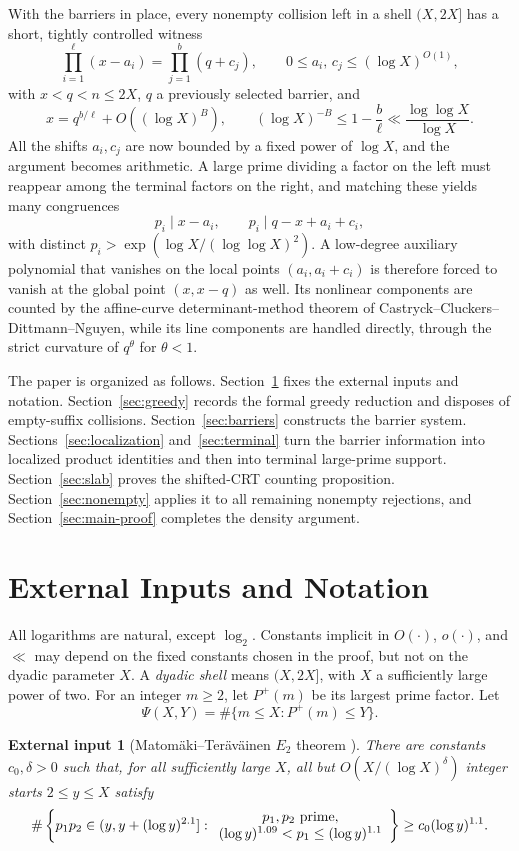 \documentclass[11pt]{article}
\newtheorem{external}[theorem]{External input}
\theoremstyle{definition}
\newcommand{\pplus}{P^+}
\newcommand{\1}{\mathbf 1}
\begin{document}
With the barriers in place, every nonempty collision left in a shell
\((X,2X]\) has a short, tightly controlled witness
\[
  \prod_{i=1}^{\ell}(x-a_i)=\prod_{j=1}^{b}(q+c_j),
  \qquad 0\le a_i,\, c_j \le (\log X)^{O(1)},
\]
with \(x<q<n\le 2X\), \(q\) a previously selected barrier, and
\[
  x=q^{b/\ell}+O((\log X)^B),\qquad
  (\log X)^{-B}\le 1-\frac b\ell \ll \frac{\log\log X}{\log X}.
\]
All the shifts \(a_i,c_j\) are now bounded by a fixed power of \(\log X\), and
the argument becomes arithmetic.  A large prime dividing a factor on the left
must reappear among the terminal factors on the right, and matching these
yields many congruences
\[
  p_i\mid x-a_i,\qquad p_i\mid q-x+a_i+c_i,
\]
with distinct \(p_i>\exp(\log X/(\log\log X)^2)\).  A low-degree auxiliary
polynomial that vanishes on the local points \((a_i,a_i+c_i)\) is therefore
forced to vanish at the global point \((x,x-q)\) as well.  Its nonlinear
components are counted by the affine-curve determinant-method theorem of
Castryck--Cluckers--Dittmann--Nguyen, while its line components are handled
directly, through the strict curvature of \(q^\theta\) for \(\theta<1\).

The paper is organized as follows.  Section~\ref{sec:inputs} fixes the
external inputs and notation.  Section~\ref{sec:greedy} records the formal
greedy reduction and disposes of empty-suffix collisions.
Section~\ref{sec:barriers} constructs the barrier system.
Sections~\ref{sec:localization} and~\ref{sec:terminal} turn the barrier
information into localized product identities and then into terminal
large-prime support.  Section~\ref{sec:slab} proves the shifted-CRT counting
proposition.  Section~\ref{sec:nonempty} applies it to all remaining nonempty
rejections, and Section~\ref{sec:main-proof} completes the density argument.

\section{External Inputs and Notation}\label{sec:inputs}

All logarithms are natural, except \(\log_2\).  Constants implicit in
\(O(\cdot)\), \(o(\cdot)\), and \(\ll\) may depend on the fixed constants
chosen in the proof, but not on the dyadic parameter \(X\).  A \emph{dyadic
shell} means \((X,2X]\), with \(X\) a sufficiently large power of two.
For an integer \(m\ge2\), let \(\pplus(m)\) be its largest prime factor.  Let
\[
  \Psi(X,Y)=\#\{m\le X:\pplus(m)\le Y\}.
\]

\begin{external}[Matom\"aki--Ter\"av\"ainen \(E_2\) theorem \cite{MT}]\label{inp:MT}
There are constants \(c_0,\delta>0\) such that, for all sufficiently large
\(X\), all but \(O(X/(\log X)^\delta)\) integer starts \(2\le y\le X\) satisfy
\[
\#\left\{p_1p_2\in (y,y+(\log y)^{2.1}]:
\begin{array}{c}
p_1,p_2\ {\rm prime},\\
(\log y)^{1.09}<p_1\le(\log y)^{1.1}
\end{array}\right\}
\ge c_0(\log y)^{1.1}.
\]
\end{external}
\end{document}
